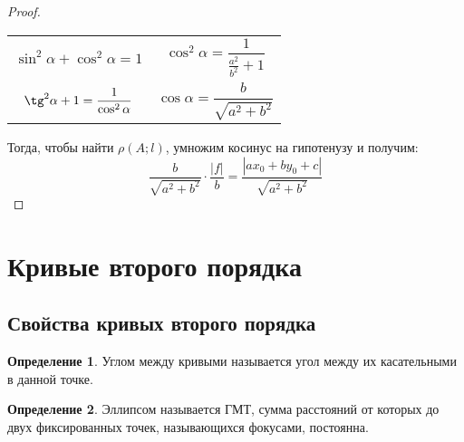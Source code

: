 \documentclass[12pt]{article}
\theoremstyle{definition}
\newtheorem{definition}{Определение}
\begin{document}
\begin{proof}
        \setlength{\tabcolsep}{1em}
        \def\arraystretch{1.5}
        \begin{center}
            \begin{tabular}{cc}
                $\sin^2\alpha+\cos^2\alpha=1$ & $\cos^2\alpha=\dfrac{1}{\frac{a^2}{b^2}+1}$\\
                $\tg^2\alpha+1=\dfrac{1}{\cos^2\alpha}$ & $\cos \alpha = \dfrac{b}{\sqrt{a^2+b^2}}$
            \end{tabular}
        \end{center}
    Тогда, чтобы найти $\rho(A;l)$, умножим косинус на гипотенузу и получим: 
    $$\dfrac{b}{\sqrt{a^2+b^2}} \cdot \dfrac{|f|}{b}=\dfrac{|ax_0+by_0+c|}{\sqrt{a^2+b^2}}$$ 
    \end{proof}

    \section{Кривые второго порядка}
    \subsection{Свойства кривых второго порядка}

    \begin{definition}
        Углом между кривыми называется угол между их касательными в данной точке.
    \end{definition}

    \begin{definition}
        Эллипсом называется ГМТ, сумма расстояний от которых до двух фиксированных точек, называющихся фокусами, постоянна.
    \end{definition}

    \begin{center}
    \end{center}
\end{document}
